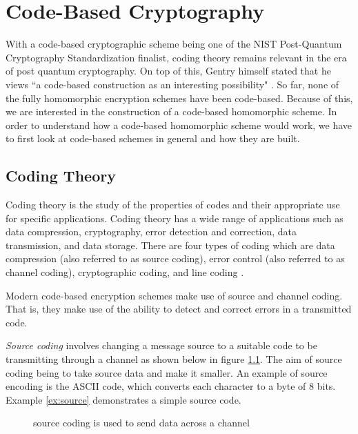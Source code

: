 \chapter{Code-Based Cryptography}

With a code-based cryptographic scheme being one of the NIST Post-Quantum Cryptography Standardization finalist, coding theory remains relevant in the era of post quantum cryptography. On top of this, Gentry himself stated that he views ``a code-based construction as an interesting possibility" \cite[p. 11]{gentry}. So far, none of the fully homomorphic encryption schemes have been code-based. Because of this, we are interested in the construction of a code-based homomorphic scheme. In order to understand how a code-based homomorphic scheme would work, we have to first look at code-based schemes in general and how they are built.

\section{Coding Theory}

Coding theory is the study of the properties of codes and their appropriate use for specific applications. Coding theory has a wide range of applications such as data compression, cryptography, error detection and correction, data transmission, and data storage. There are four types of coding which are data compression (also referred to as source coding), error control (also referred to as channel coding), cryptographic coding, and line coding \cite{irvine2001}.

Modern code-based encryption schemes make use of source and channel coding. That is, they make use of the ability to detect and correct errors in a transmitted code.

\textit{Source coding} involves changing a message source to a suitable code to be transmitting through a channel as shown below in figure \ref{fig:datapath}. The aim of source coding being to take source data and make it smaller. An example of source encoding is the ASCII code, which converts each character to a byte of 8 bits. Example \ref{ex:source} demonstrates a simple source code.


\begin{figure}
    \centering
    \caption{source coding is used to send data across a channel}
    \label{fig:datapath}
\end{figure}

